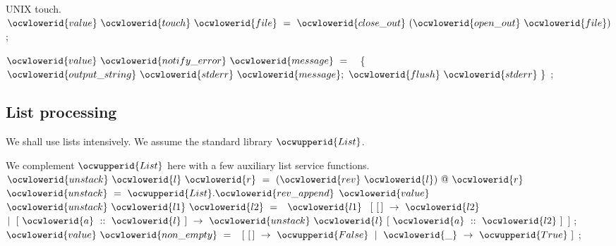 \documentclass[12pt]{article}
\begin{document}
\ocwendcode{}\ocwindent{0.00em}
UNIX touch. 
\ocweol
\label{../ML/gen.ml:1245}%
\medskip
\ocwbegincode{}\ocwindent{0.00em}
$\ocwlowerid{value}~\ocwlowerid{touch}~\ocwlowerid{file}~=~\ocwlowerid{close\_out}~(\ocwlowerid{open\_out}~\ocwlowerid{file})$\ocweol
\ocwindent{0.00em}
;\medskip

\label{../ML/gen.ml:1293}%
\ocwindent{0.00em}
$\ocwlowerid{value}~\ocwlowerid{notify\_error}~\ocwlowerid{message}~=~$\ocweol
\ocwindent{1.00em}
~\{~$\ocwlowerid{output\_string}~\ocwlowerid{stderr}~\ocwlowerid{message};~\ocwlowerid{flush}~\ocwlowerid{stderr}~\}$\ocweol
\ocwindent{0.00em}
;\ocweol
\ocweol
\ocwendcode{}\subsection{List processing}

We shall use lists intensively. We assume the standard library 
\ocwbegincode{}$\ocwupperid{List}$\ocwendcode{}. %

\label{../ML/list2.ml:0}%
We complement \ocwbegindcode{}$\ocwupperid{List}$\ocwenddcode{} here with a few auxiliary list service functions. 
\ocweol
\ocwindent{0.00em}
\ocwbegindcode{}$\ocwlowerid{unstack}~\ocwlowerid{l}~\ocwlowerid{r}~=~(\ocwlowerid{rev}~\ocwlowerid{l})~@~\ocwlowerid{r}$\ocwenddcode{} 
\ocweol
\ocwindent{0.00em}
\ocwbegindcode{}$\ocwlowerid{unstack}~=~\ocwupperid{List}.\ocwlowerid{rev\_append}$\ocwenddcode{} 
\ocweol
\label{../ML/list2.ml:794}%
\medskip
\ocwbegincode{}\ocwindent{0.00em}
$\ocwlowerid{value}~$~$\ocwlowerid{unstack}~\ocwlowerid{l1}~\ocwlowerid{l2}~=$\ocweol
\ocwindent{1.00em}
~$\ocwlowerid{l1}~$\ocweol
\ocwindent{1.00em}
$[~[\,]~\rightarrow{}~\ocwlowerid{l2}$\ocweol
\ocwindent{1.00em}
$\mid{}~[~\ocwlowerid{a}~::~\ocwlowerid{l}~]~\rightarrow{}~\ocwlowerid{unstack}~\ocwlowerid{l}~[~\ocwlowerid{a}~::~\ocwlowerid{l2}~]$\ocweol
\ocwindent{1.00em}
$]$\ocweol
\ocwindent{0.00em}
;\ocweol
\ocwindent{0.00em}
$\ocwlowerid{value}~\ocwlowerid{non\_empty}~=~$~$[~[\,]~\rightarrow{}~\ocwupperid{False}~\mid{}~\ocwlowerid{\_}~\rightarrow{}~\ocwupperid{True}~]$\ocweol
\ocwindent{0.00em}
;\medskip
\end{document}
